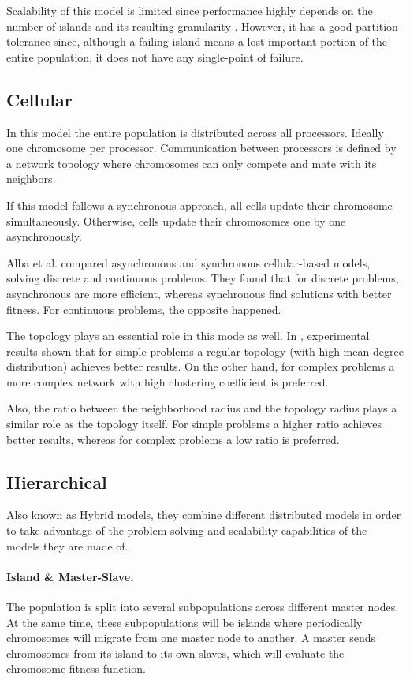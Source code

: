 Scalability of this model is limited since performance highly depends on the number of islands and its resulting granularity \cite{58}. However, it has a good partition-tolerance since, although a failing island means a lost important portion of the entire population, it does not have any single-point of failure.

\subsection{Cellular}
In this model the entire population is distributed across all processors. Ideally one chromosome per processor. Communication between processors is defined by a network topology where chromosomes can only compete and mate with its neighbors.

If this model follows a synchronous approach, all cells update their chromosome simultaneously. Otherwise, cells update their chromosomes one by one asynchronously.

Alba et al. \cite{2} compared asynchronous and synchronous cellular-based models, solving discrete and continuous problems. They found that for discrete problems, asynchronous are more efficient, whereas synchronous find solutions with better fitness. For continuous problems, the opposite happened.

The topology plays an essential role in this mode as well. In \cite{68}, experimental results shown that for simple problems a regular topology (with high mean degree distribution) achieves better results. On the other hand, for complex problems a more complex network with high clustering coefficient is preferred.

Also, the ratio between the neighborhood radius and the topology radius plays a similar role as the topology itself. For simple problems a higher ratio achieves better results, whereas for complex problems a low ratio is preferred.\cite{5}

\subsection{Hierarchical}
Also known as Hybrid models, they combine different distributed models in order to take advantage of the problem-solving and scalability capabilities of the models they are made of.

\paragraph*{Island \& Master-Slave.} The population is split into several subpopulations across different master nodes. At the same time, these subpopulations will be islands where periodically chromosomes will migrate from one master node to another. A master sends chromosomes from its island to its own slaves, which will evaluate the chromosome fitness function.

